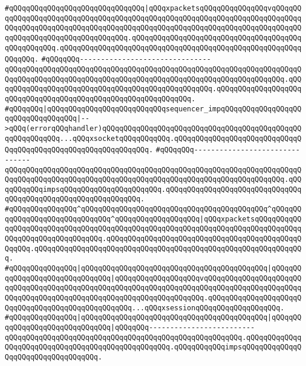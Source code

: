 \verb|#qQQqqQQqqQQqqQQqqQQqqQQqqQQqqQQq|\verb#|qQQqxpacketsqQQqqQQqqQQqqQQqvqQQqqQQqqQQqqQQqqQQqqQQqqQQqqQQqqQQqqQQqqQQqqQQqqQQqqQQqqQQqqQQqqQQqqQQqqQQqqQQqqQQqqQQqqQQqqQQqqQQqqQQqqQQqqQQqqQQqqQQqqQQqqQQqqQQqqQQqqQQqqQQqqQQqqQQqqQQqqQQqqQQqqQQqqQQqqQQq.qQQqqQQqqQQqqQQqqQQqqQQqqQQqqQQqqQQqqQQqqQQqqQQqqQQq.qQQqqQQqqQQqqQQqqQQqqQQqqQQqqQQqqQQqqQQqqQQqqQQqqQQqqQQqqQQqqQQq.#\newline
\verb|#qQQqqQQq-------------------------------qQQqqQQqqQQqqQQqqQQqqQQqqQQqqQQqqQQqqQQqqQQqqQQqqQQqqQQqqQQqqQQqqQQqqQQqqQQqqQQqqQQqqQQqqQQqqQQqqQQqqQQqqQQqqQQqqQQqqQQqqQQqqQQqqQQqqQQq.qQQqqQQqqQQqqQQqqQQqqQQqqQQqqQQqqQQqqQQqqQQqqQQqqQQq.qQQqqQQqqQQqqQQqqQQqqQQqqQQqqQQqqQQqqQQqqQQqqQQqqQQqqQQqqQQqqQQq.|\newline
\verb|#qQQqqQQq|\verb#|qQQqqQQqqQQqqQQqqQQqqQQqqQQqsequencer_impqQQqqQQqqQQqqQQqqQQqqQQqqQQqqQQqqQQq|-->qQQq(errorqQQqhandler)qQQqqQQqqQQqqQQqqQQqqQQqqQQqqQQqqQQqqQQqqQQqqQQqqQQqqQQqqQQq...qQQqxsocketqQQqqQQqqQQq.qQQqqQQqqQQqqQQqqQQqqQQqqQQqqQQqqQQqqQQqqQQqqQQqqQQqqQQqqQQqqQQq.#\newline
\verb|#qQQqqQQq-------------------------------qQQqqQQqqQQqqQQqqQQqqQQqqQQqqQQqqQQqqQQqqQQqqQQqqQQqqQQqqQQqqQQqqQQqqQQqqQQqqQQqqQQqqQQqqQQqqQQqqQQqqQQqqQQqqQQqqQQqqQQqqQQqqQQqqQQqqQQq.qQQqqQQqqQQqimpsqQQqqQQqqQQqqQQqqQQqqQQq.qQQqqQQqqQQqqQQqqQQqqQQqqQQqqQQqqQQqqQQqqQQqqQQqqQQqqQQqqQQqqQQq.|\newline
\verb|#qQQqqQQqqQQqqQQq^qQQqqQQqqQQqqQQqqQQqqQQqqQQqqQQqqQQqqQQqqQQq^qQQqqQQqqQQqqQQqqQQqqQQqqQQqqQQq^qQQqqQQqqQQqqQQqqQQq|\verb#|qQQqxpacketsqQQqqQQqqQQqqQQqqQQqqQQqqQQqqQQqqQQqqQQqqQQqqQQqqQQqqQQqqQQqqQQqqQQqqQQqqQQqqQQqqQQqqQQqqQQqqQQqqQQqqQQq.qQQqqQQqqQQqqQQqqQQqqQQqqQQqqQQqqQQqqQQqqQQqqQQqqQQq.qQQqqQQqqQQqqQQqqQQqqQQqqQQqqQQqqQQqqQQqqQQqqQQqqQQqqQQqqQQqqQQq.#\newline
\verb|#qQQqqQQqqQQqqQQq|\verb#|qQQqqQQqqQQqqQQqqQQqqQQqqQQqqQQqqQQqqQQqqQQq|qQQqqQQqqQQqqQQqqQQqqQQqqQQqqQQq|qQQqqQQqqQQqqQQqqQQqvqQQqqQQqqQQqqQQqqQQqqQQqqQQqqQQqqQQqqQQqqQQqqQQqqQQqqQQqqQQqqQQqqQQqqQQqqQQqqQQqqQQqqQQqqQQqqQQqqQQqqQQqqQQqqQQqqQQqqQQqqQQqqQQqqQQqqQQqqQQq.qQQqqQQqqQQqqQQqqQQqqQQqqQQqqQQqqQQqqQQqqQQqqQQqqQQq...qQQqxsessionqQQqqQQqqQQqqQQqqQQq.#\newline
\verb|#qQQqqQQqqQQqqQQq|\verb#|qQQqqQQqqQQqqQQqqQQqqQQqqQQqqQQqqQQqqQQqqQQq|qQQqqQQqqQQqqQQqqQQqqQQqqQQqqQQq|qQQqqQQq-------------------------qQQqqQQqqQQqqQQqqQQqqQQqqQQqqQQqqQQqqQQqqQQqqQQqqQQqqQQq.qQQqqQQqqQQqqQQqqQQqqQQqqQQqqQQqqQQqqQQqqQQqqQQqqQQq.qQQqqQQqqQQqimpsqQQqqQQqqQQqqQQqqQQqqQQqqQQqqQQqqQQq.#\newline
